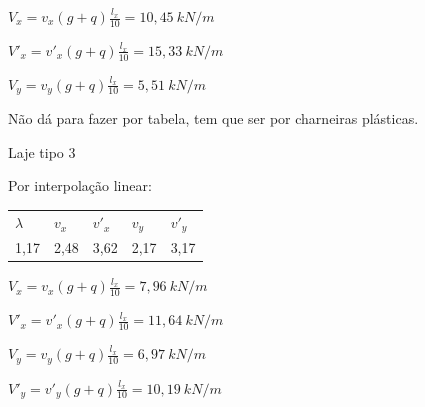 \begin{resposta}
\begin{enumerate}[start=2]
\begin{enumerate}
            $V_x = v_x(g+q)\frac{l_x}{10}= 10,45 \ kN/m$

            $V'_x = v'_x(g+q)\frac{l_x}{10}= 15,33 \ kN/m$

            $V_y = v_y(g+q)\frac{l_x}{10}= 5,51 \ kN/m$

    
    
            

            \begin{observacao}
                Não dá para fazer por tabela, tem que ser por charneiras plásticas.
            \end{observacao}
    
    
            

            Laje tipo 3 \cite[tabela 2.2b]{tabelalajes}

            Por interpolação linear:

            \begin{table}[h]
                \centering
                \color{gray!80!black} 
                \begin{tabular}{l l l l l}
                    $\lambda$ & $v_x$ & $v'_x$ & $v_y$ & $v'_y$ \\
                    1,17 & 2,48 & 3,62 & 2,17 & 3,17
                \end{tabular}
            \end{table}

            $V_x = v_x(g+q)\frac{l_x}{10}= 7,96 \ kN/m$

            $V'_x = v'_x(g+q)\frac{l_x}{10}= 11,64 \ kN/m$

            $V_y = v_y(g+q)\frac{l_x}{10}= 6,97 \ kN/m$

            $V'_y = v'_y(g+q)\frac{l_x}{10}= 10,19 \ kN/m$
            
        \end{enumerate}

    \end{enumerate}
\end{resposta}
